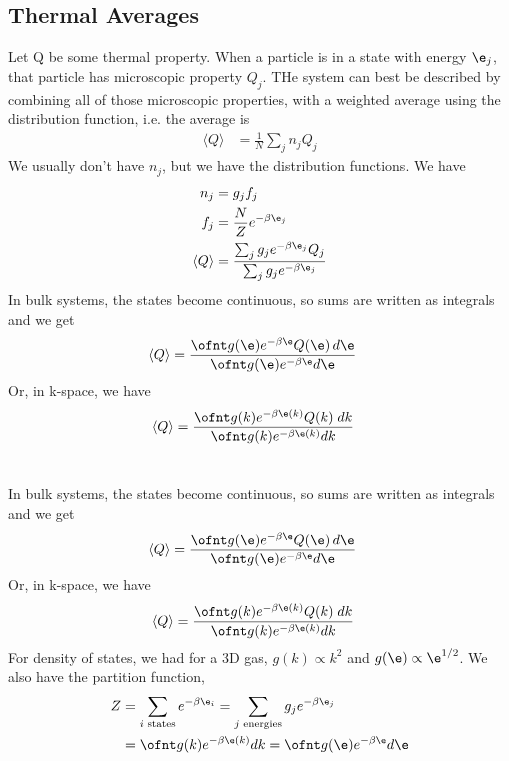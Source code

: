 \documentclass[a4paper, 11pt, normalem]{report}
\begin{document}
\section{Thermal Averages}
Let Q be some thermal property. 
When a particle is in a state with energy $\e_j$, that particle has microscopic property $Q_j$.
THe system can best be described by combining all of those microscopic properties, with a weighted average using the distribution function, i.e. the average is
\begin{align}
    \langle Q\rangle &= \frac{1}{N}\sum_j n_jQ_j
\end{align}
We usually don't have $n_j$, but we have the distribution functions. 
We have 
\begin{align}
    n_j &= g_jf_j \\
    f_j &= \frac{N}{Z}e^{-\beta\e_j} \\
    \langle Q\rangle &= \frac{\sum_j g_j e^{-\beta\e_j}Q_j}{\sum_j g_je^{-\beta\e_j}}
\end{align}
In bulk systems, the states become continuous, so sums are written as integrals and we get
\begin{align}
    \langle Q\rangle &= \frac{\ofnt g(\e)e^{-\beta\e}Q(\e)\,d\e}{\ofnt g(\e)e^{-\beta\e}d\e}
\end{align}
Or, in k-space, we have
\begin{align}
    \langle Q\rangle &= \frac{\ofnt g(k)e^{-\beta\e(k)}Q(k)\;dk}{\ofnt g(k)e^{-\beta\e(k)}dk}
\end{align}

\chapter{}
In bulk systems, the states become continuous, so sums are written as integrals and we get
\begin{align}
    \langle Q\rangle &= \frac{\ofnt g(\e)e^{-\beta\e}Q(\e)\,d\e}{\ofnt g(\e)e^{-\beta\e}d\e}
\end{align}
Or, in k-space, we have
\begin{align}
    \langle Q\rangle &= \frac{\ofnt g(k)e^{-\beta\e(k)}Q(k)\;dk}{\ofnt g(k)e^{-\beta\e(k)}dk}
\end{align}
For density of states, we had for a 3D gas, $g(k) \propto k^2$ and $g(\e) \propto \e^{1/2}$.
We also have the partition function, 
\begin{align}
    Z &= \sum_{i\text{ states}} e^{-\beta\e_i} = \sum_{j\text{ energies}} g_je^{-\beta\e_j} \\
      &= \ofnt g(k)e^{-\beta \e(k)}dk = \ofnt g(\e)e^{-\beta\e}d\e
\end{align}
\end{document}
